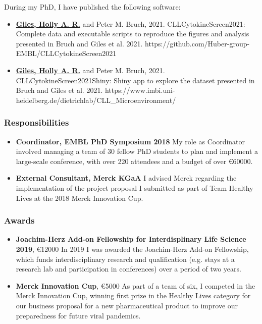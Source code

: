 \documentclass[11pt, a4paper, twosided]{book}
\begin{document}
    During my PhD, I have published the following software:
    \begin{itemize}
      \item \textbf{\underline{Giles, Holly A. R.}} and Peter M. Bruch, 2021. CLLCytokineScreen2021: Complete data and executable scripts to reproduce the figures and analysis presented in Bruch and Giles et al. 2021. https://github.com/Huber-group-EMBL/CLLCytokineScreen2021
      
      \item \textbf{\underline{Giles, Holly A. R.}} and Peter M. Bruch, 2021. CLLCytokineScreen2021Shiny: Shiny app to explore the dataset presented in Bruch and Giles et al. 2021. https://www.imbi.uni-heidelberg.de/dietrichlab/CLL_Microenvironment/
    \end{itemize}
    \hypertarget{responsibilities}{%
    \subsubsection{Responsibilities}\label{responsibilities}}
    \begin{itemize}
      \item \textbf{Coordinator, EMBL PhD Symposium 2018} My role as Coordinator involved managing a team of 30 fellow PhD students to plan and implement a large-scale conference, with over 220 attendees and a budget of over \euro{60000}. 
      \item \textbf{External Consultant, Merck KGaA} I advised Merck regarding the implementation of the project proposal I submitted as part of Team Healthy Lives at the 2018 Merck Innovation Cup.
    \end{itemize}
    \hypertarget{awards}{%
    \subsubsection{Awards}\label{awards}}
    \begin{itemize}
      \item \textbf{Joachim-Herz Add-on Fellowship for Interdisplinary Life Science 2019}, \euro{12000} In 2019 I was awarded the Joachim-Herz Add-on Fellowship, which funds interdisciplinary research and qualification (e.g. stays at a research lab and participation in conferences) over a period of two years.
      \item \textbf{Merck Innovation Cup}, \euro{5000} As part of a team of six, I competed in the Merck Innovation Cup, winning first prize in the Healthy Lives category for our business proposal for a new pharmaceutical product to improve our preparedness for future viral pandemics.
    \end{itemize}
\newpage\null\newpage
\end{document}
